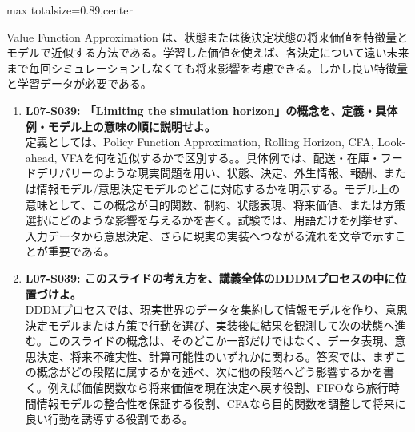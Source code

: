\begin{minipage}[t]{0.58\textwidth}
\begin{adjustbox}{max totalsize={\textwidth}{0.89\textheight},center}
\begin{minipage}{\textwidth}
Value Function Approximation は、状態または後決定状態の将来価値を特徴量とモデルで近似する方法である。学習した価値を使えば、各決定について遠い未来まで毎回シミュレーションしなくても将来影響を考慮できる。しかし良い特徴量と学習データが必要である。\par{}\begin{enumerate}\item \textbf{L07-S039: 「Limiting the simulation horizon」の概念を、定義・具体例・モデル上の意味の順に説明せよ。}\\定義としては、Policy Function Approximation, Rolling Horizon, CFA, Look-ahead, VFAを何を近似するかで区別する。。具体例では、配送・在庫・フードデリバリーのような現実問題を用い、状態、決定、外生情報、報酬、または情報モデル/意思決定モデルのどこに対応するかを明示する。モデル上の意味として、この概念が目的関数、制約、状態表現、将来価値、または方策選択にどのような影響を与えるかを書く。試験では、用語だけを列挙せず、入力データから意思決定、さらに現実の実装へつながる流れを文章で示すことが重要である。\item \textbf{L07-S039: このスライドの考え方を、講義全体のDDDMプロセスの中に位置づけよ。}\\DDDMプロセスでは、現実世界のデータを集約して情報モデルを作り、意思決定モデルまたは方策で行動を選び、実装後に結果を観測して次の状態へ進む。このスライドの概念は、そのどこか一部だけではなく、データ表現、意思決定、将来不確実性、計算可能性のいずれかに関わる。答案では、まずこの概念がどの段階に属するかを述べ、次に他の段階へどう影響するかを書く。例えば価値関数なら将来価値を現在決定へ戻す役割、FIFOなら旅行時間情報モデルの整合性を保証する役割、CFAなら目的関数を調整して将来に良い行動を誘導する役割である。\end{enumerate}
\end{minipage}
\end{adjustbox}
\end{minipage}


